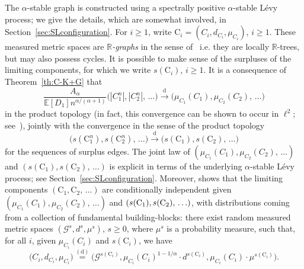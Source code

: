 \documentclass[AHL,Unicode,longabstracts,published]{cedram}
\newcommand{\convdist}{\ensuremath{\overset{\mathrm{d}}{\rightarrow}}}
\newcommand{\equidist}{\ensuremath{\stackrel{\mathrm{(d)}}{=}}}
\newcommand{\rmC}{\mathrm{C}}
\newcommand{\cG}{\mathcal{G}}
\newcommand{\R}{\mathbb{R}}
\newcommand{\bbE}{\mathbb{E}}
\newcommand{\R}{\mathbb{R}}
\begin{document}
The $\alpha$-stable graph is constructed using a spectrally positive $\alpha$-stable Lévy process; we give the details, which are somewhat involved, in Section~\ref{sec:SLconfiguration}. For $i \ge 1$, write $\rmC_i = (C_i, d_{C_i}, \mu_{C_i})$, $i \ge 1$. These measured metric spaces are \emph{$\R$-graphs} in the sense of~\cite{ABBrGoMi} i.e. they are locally $\R$-trees, but may also possess cycles. It is possible to make sense of the surpluses of the limiting components, for which we write $s(\rmC_i)$, $i \ge 1$. It is a consequence of Theorem~\ref{th:C-K+G} that
\begin{equation}\label{eqn:convsizes}
\frac{A_{\alpha}}{\bbE[D_1] n^{\alpha/(\alpha+1)}}\big(\left|C_1^n\right|, \left|C_2^n\right|,\,\ldots\big) \convdist \big(\mu_{C_1}\left(C_1\right), \mu_{C_2}\left(C_2\right),\, \ldots\big)
\end{equation}
in the product topology (in fact, this convergence can be shown to occur in $\ell^2$; see~\cite[Proposition~5.6]{CKG17+}), jointly with the convergence in the sense of the product topology
\begin{equation}\label{eqn:convsurplus}
\big(s\left(\rmC_1^n\right), s\left(\rmC_2^n\right),\, \ldots\big) \convdist \big(s\left(\rmC_1\right), s\left(\rmC_2\right),\,\ldots\big)
\end{equation}
for the sequences of surplus edges. The joint law of $(\mu_{C_1}(C_1), \mu_{C_2}(C_2),\,\ldots)$ and $(s(\rmC_1), s(\rmC_2),\,\ldots)$ is explicit in terms of the underlying $\alpha$-stable Lévy process; see Section~\ref{sec:SLconfiguration}. Moreover, \cite[Theorem~1.2]{CKG17+} shows that the limiting components $(\rmC_1,\rmC_2,\,\ldots)$ are conditionally independent given $(\mu_{C_1}(C_1), \mu_{C_2}(C_2),\,\ldots)$ and $(s(\rmC_1),\linebreak s(\rmC_2),\,\ldots)$, with distributions coming from a collection of fundamental building-blocks: there exist random measured metric spaces $(\cG^s,d^s, \mu^s)$, $s \geq 0$, where $\mu^s$ is a probability measure, such that, for all $i$, given $\mu_{C_i}(C_i)$ and $s(\rmC_i)$, we have
\[
\big(C_i, d_{C_i}, \mu_{C_i} \big)\equidist \big(\cG^{s(\rmC_i)}, \mu_{C_i}(C_i)^{1-1/\alpha} \cdot d^{s(\rmC_i)}, \mu_{C_i}(C_i) \cdot \mu^{s(\rmC_i)}\big).
\]
\end{document}
